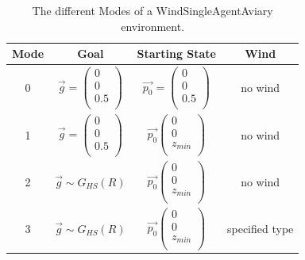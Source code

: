 \begin{table}[htp]
	\centering
	\caption{The different Modes of a WindSingleAgentAviary environment.}\label{tab:mode}
	\begin{tabular}{|c|c|c|c|}
		\hline
		Mode & Goal & Starting State & Wind\\
		\hline
		0 & $\overrightarrow{g} =\left(\begin{array}{c}
			0\\
			0\\
			0.5\\
		\end{array}
		\right)$ & $\overrightarrow{p_0} = \left(\begin{array}{c}
			0\\
			0\\
			0.5\\
		\end{array}
		\right)$ & no wind\\
		\hline
		1 & $\overrightarrow{g} = \left(\begin{array}{c}
			0\\
			0\\
			0.5\\
		\end{array}
		\right)$ & $\overrightarrow{p_0}\left(\begin{array}{c}
			0\\
			0\\
			z_{min}\\
		\end{array}
		\right)$ & no wind\\
		\hline
		2 & $\overrightarrow{g} \sim G_{HS}(R) $& $\overrightarrow{p_0}\left(\begin{array}{c}
			0\\
			0\\
			z_{min}\\
		\end{array}
		\right)$  & no wind\\
		\hline
		3 & $\overrightarrow{g} \sim G_{HS}(R) $& $\overrightarrow{p_0}\left(\begin{array}{c}
			0\\
			0\\
			z_{min}\\
		\end{array}
		\right)$  & specified type\\
		\hline
	\end{tabular}
	\label{tab:modes}
\end{table}

